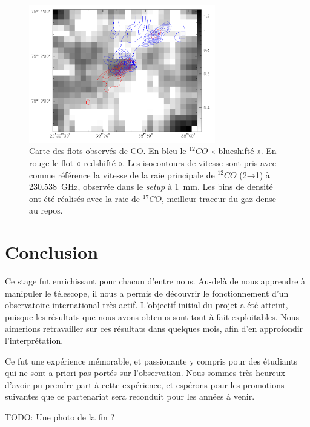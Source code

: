 \documentclass[a4paper,10pt,french]{article}
\newcommand{\setup}{\textit{setup}}
\newcommand{\unmm}{\SI{1}{\milli\meter}}
\begin{document}
\begin{figure}[ht]
    \centering
    \includegraphics[height=6cm]{mapC17O.png}
    \caption{
        Carte des flots observés de CO. En bleu le $^{12}CO$ « blueshifté ». En
        rouge le flot « redshifté ». Les isocontours de vitesse sont pris avec
        comme référence la vitesse de la raie principale de $^{12}CO$ (2→1) à
        \SI{230.538}{\giga\hertz}, observée dans le \setup{} à \unmm. Les bins
        de densité ont été réalisés avec la raie de $^{17}CO$, meilleur traceur
        du gaz dense au repos.
    }
    \label{mapC17O}
\end{figure}

\section*{Conclusion}

Ce stage fut enrichissant pour chacun d’entre nous. Au-delà de nous apprendre à
manipuler le télescope, il nous a permis de découvrir le fonctionnement d’un
observatoire international très actif. L’objectif initial du projet a été
atteint, puisque les résultats que nous avons obtenus sont tout à fait
exploitables. Nous aimerions retravailler sur ces résultats dans quelques mois,
afin d’en approfondir l’interprétation.

Ce fut une expérience mémorable, et passionante y compris pour des étudiants
qui ne sont a priori pas portés sur l’observation. Nous sommes très heureux
d’avoir pu prendre part à cette expérience, et espérons pour les promotions
suivantes que ce partenariat sera reconduit pour les années à venir.

TODO: Une photo de la fin ?
\end{document}
